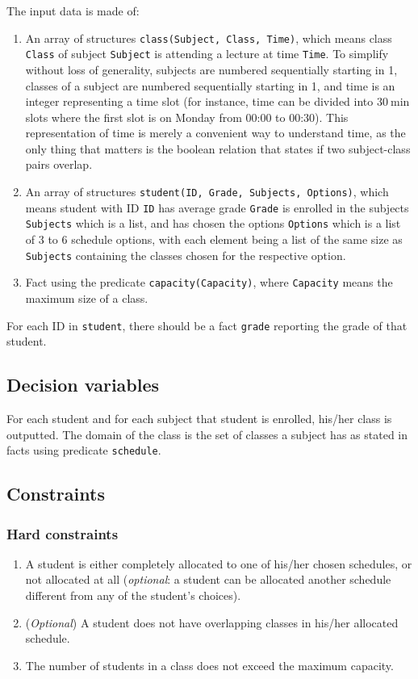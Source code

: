 \documentclass[runningheads]{llncs}
\begin{document}
The input data is made of:
\begin{enumerate}
    \item An array of structures \texttt{class(Subject, Class, Time)}, which means class \texttt{Class} of subject \texttt{Subject} is attending a lecture at time \texttt{Time}. To simplify without loss of generality, subjects are numbered sequentially starting in 1, classes of a subject are numbered sequentially starting in 1, and time is an integer representing a time slot (for instance, time can be divided into $\SI{30}{\minute}$ slots where the first slot is on Monday from 00:00 to 00:30). This representation of time is merely a convenient way to understand time, as the only thing that matters is the boolean relation that states if two subject-class pairs overlap.
    \item An array of structures \texttt{student(ID, Grade, Subjects, Options)}, which means student with ID \texttt{ID} has average grade \texttt{Grade} is enrolled in the subjects \texttt{Subjects} which is a list, and has chosen the options  \texttt{Options} which is a list of 3 to 6 schedule options, with each element being a list of the same size as \texttt{Subjects} containing the classes chosen for the respective option.
    \item Fact using the predicate \texttt{capacity(Capacity)}, where \texttt{Capacity} means the maximum size of a class.
\end{enumerate}

For each ID in \texttt{student}, there should be a fact \texttt{grade} reporting the grade of that student.

\subsection{Decision variables}

For each student and for each subject that student is enrolled, his/her class is outputted. The domain of the class is the set of classes a subject has as stated in facts using predicate \texttt{schedule}.

\subsection{Constraints}

\subsubsection{Hard constraints}
\begin{enumerate}
    \item A student is either completely allocated to one of his/her chosen schedules, or not allocated at all (\textit{optional}: a student can be allocated another schedule different from any of the student's choices).
    \item (\textit{Optional}) A student does not have overlapping classes in his/her allocated schedule.
    \item The number of students in a class does not exceed the maximum capacity.
\end{enumerate}
\end{document}
